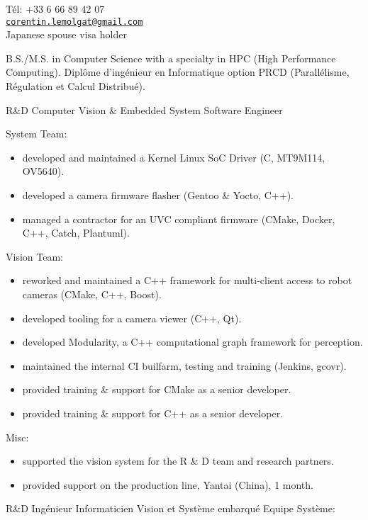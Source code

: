 \documentclass{article}
\begin{document}


T\'{e}l: +33 6 66 89 42 07\\
\href{mailto:corentin.lemolgat@gmail.com}{\texttt{corentin.lemolgat@gmail.com}}\\
Japanese spouse visa holder\\

\begin{llist}
 
 {
B.S./M.S. in Computer Science with a specialty in HPC (High Performance Computing).
} {
Dipl\^{o}me d'ing\'{e}nieur en Informatique option PRCD (Parall\'{e}lisme,
R\'{e}gulation et Calcul Distribu\'{e}).
}

{}
{}
\vspace{-0.33cm}

 {
R\&D Computer Vision \& Embedded System Software Engineer\\
\vspace{-0.33cm}

System Team:
\begin{itemize}
\item developed and maintained a Kernel Linux SoC Driver (C, MT9M114, OV5640).
\item developed a camera firmware flasher (Gentoo \& Yocto, C++).
\item managed a contractor for an UVC compliant firmware (CMake, Docker, C++, Catch, Plantuml).
\end{itemize}
Vision Team:
\begin{itemize}
\item reworked and maintained a C++ framework for multi-client access to robot cameras (CMake, C++, Boost).
\item developed tooling for a camera viewer (C++, Qt).
\item developed Modularity, a C++ computational graph framework for perception.
\item maintained the internal CI builfarm, testing and training (Jenkins,
 gcovr).
\item provided training \& support for CMake as a senior developer.
\item provided training \& support for C++ as a senior developer.
\end{itemize}
Misc:
\begin{itemize}
\item supported the vision system for the R \& D team and research partners.
\item provided support on the production line, Yantai (China), 1 month.
\end{itemize}
}{
R\&D Ing\'{e}nieur Informaticien Vision et Syst\`{e}me embarqu\'{e}
\vspace{-0.33cm}
Equipe Syst\`{e}me:

}
\end{llist}
\end{document}
